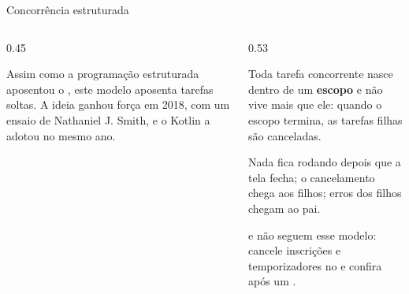 \begin{frame}{Concorrência estruturada}
  \begin{columns}[c]
    \begin{column}{0.45\textwidth}
      \centering
      \begin{historia}
        Assim como a programação estruturada aposentou o , este modelo aposenta tarefas soltas. A ideia ganhou força em 2018, com um ensaio de Nathaniel J. Smith, e o Kotlin a adotou no mesmo ano.
      \end{historia}
    \end{column}
    \begin{column}{0.53\textwidth}
      \begin{definicao}
        Toda tarefa concorrente nasce dentro de um \textbf{escopo} e não vive mais que ele: quando o escopo termina, as tarefas filhas são canceladas.
      \end{definicao}
      \begin{conceito}[Garantias]
        Nada fica rodando depois que a tela fecha; o cancelamento chega aos filhos; erros dos filhos chegam ao pai.
      \end{conceito}
      \begin{atencao}[E no Dart?]
         e  não seguem esse modelo: cancele inscrições e temporizadores no  e confira  após um .
      \end{atencao}
    \end{column}
  \end{columns}
\end{frame}


